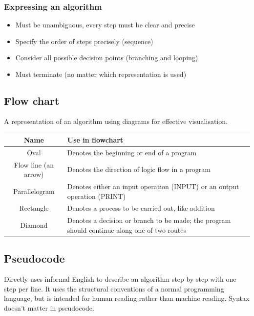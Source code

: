 \documentclass[11pt]{article}
\begin{document}
\subsubsection{Expressing an algorithm}
\label{sec:org1459a98}
\begin{itemize}
\item Must be unambiguous, every step must be clear and precise
\item Specify the order of steps precisely (sequence)
\item Consider all possible decision points (branching and looping)
\item Must terminate (no matter which representation is used)
\end{itemize}

 \newpage

\subsection{Flow chart}
\label{sec:org63f5bab}
A representation of an algorithm using diagrams for effective visualisation.

\begin{center}
\begin{tabular}{|c|m{22em}|}
\hline
\textbf{Name} & \textbf{Use in flowchart}\\[0pt]
\hline
Oval & Denotes the beginning or end of a program\\[0pt]
\hline
Flow line (an arrow) & Denotes the direction of logic flow in a program\\[0pt]
\hline
Parallelogram & Denotes either an input operation (INPUT) or an output operation (PRINT)\\[0pt]
\hline
Rectangle & Denotes a process to be carried out, like addition\\[0pt]
\hline
Diamond & Denotes a decision or branch to be made; the program should continue along one of two routes\\[0pt]
\hline
\end{tabular}
\end{center}

\subsection{Pseudocode}
\label{sec:org30863e3}
Directly uses informal English to describe an algorithm step by step with one step per line. It uses the structural conventions of a normal programming language, but is intended for human reading rather than machine reading. Syntax doesn't matter in pseudocode.
\end{document}
